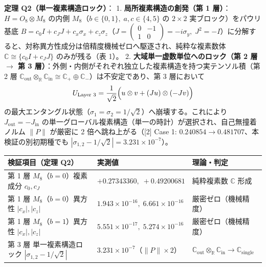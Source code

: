 \documentclass[
  a4paper,
]{ltjsarticle}
\newcounter{none} %
\begin{document}
\textbf{定理 Q2（単一複素構造ロック）}： 1.
\textbf{局所複素構造の創発（第 1 層）}：\(H = O_8 \otimes M_8\) の内側
\(M_8\)（\(b \in \{0, 1\},\; a,c \in \{4, 5\}\) の \(2\times 2\)
実ブロック）をパウリ基底
\(B = c_0 I + c_J J + c_x \sigma_x + c_z \sigma_z\)（\(J = \begin{pmatrix}0 & -1\\ 1 & 0\end{pmatrix} = -i\sigma_y,\; J^2 = -I\)）に分解すると、対称異方性成分は倍精度機械ゼロへ駆逐され、純粋な複素数体
\(\mathbb{C} \cong \{c_0 I + c_J J\}\) のみが残る（表 1）。 2.
\textbf{大域単一虚数単位へのロック（第 2 層 \(\to\) 第 3
層）}：外側・内側がそれぞれ独立した複素構造を持つ実テンソル積（第 2 層
\(\mathbb{C}_{\mathrm{out}} \otimes_{\mathbb{R}} \mathbb{C}_{\mathrm{in}} \cong \mathbb{C}_+ \oplus \mathbb{C}_-\)）は不安定であり、第
3 層において
\[U_{\text{Layer 3}} = \frac{1}{\sqrt{2}}\Bigl(u \otimes v + (Ju)\otimes(-Jv)\Bigr)\]
の最大エンタングル状態（\(\sigma_1 = \sigma_2 = 1/\sqrt{2}\)）へ崩壊する。これにより
\(J_{\mathrm{out}} = -J_{\mathrm{in}}\)
の単一グローバル複素構造（単一の時計）が選択され、自己無撞着ノルム
\(\|P\|\) が厳密に 2 倍へ跳ね上がる（{[}2{]} Case 1:
\(0.240854 \to 0.481707\)、本検証の別初期種でも
\(|\sigma_{1,2} - 1/\sqrt{2}| = 3.231 \times 10^{-7}\)）。

{\def\LTcaptype{none} %
\begin{longtable}[]{@{}
  >{\raggedright\arraybackslash}p{}
  >{\raggedright\arraybackslash}p{}
  >{\raggedright\arraybackslash}p{}@{}}
\toprule\noalign{}
\begin{minipage}[b]{\linewidth}\raggedright
検証項目（定理 Q2）
\end{minipage} & \begin{minipage}[b]{\linewidth}\raggedright
実測値
\end{minipage} & \begin{minipage}[b]{\linewidth}\raggedright
理論・判定
\end{minipage} \\
\midrule\noalign{}
\endhead
\bottomrule\noalign{}
\endlastfoot
第 1 層 \(M_8\)（\(b=0\)）複素成分 \(c_0, c_J\) &
\(+0.27343360,\; +0.49200681\) & 純粋複素数 \(\mathbb{C}\) 形成 \\
第 1 層 \(M_8\)（\(b=0\)）異方性 \(|c_x|, |c_z|\) &
\(1.943 \times 10^{-16},\; 6.661 \times 10^{-16}\) &
厳密ゼロ（機械精度） \\
第 1 層 \(M_8\)（\(b=1\)）異方性 \(|c_x|, |c_z|\) &
\(5.551 \times 10^{-17},\; 5.274 \times 10^{-16}\) &
厳密ゼロ（機械精度） \\
第 3 層 単一複素構造ロック \(|\sigma_{1,2} - 1/\sqrt{2}|\) &
\(3.231 \times 10^{-7}\)（\(\|P\| \times 2\)） &
\(\mathbb{C}_{\mathrm{out}} \otimes_{\mathbb{R}} \mathbb{C}_{\mathrm{in}} \to \mathbb{C}_{\mathrm{single}}\) \\
\end{longtable}
}
\end{document}
